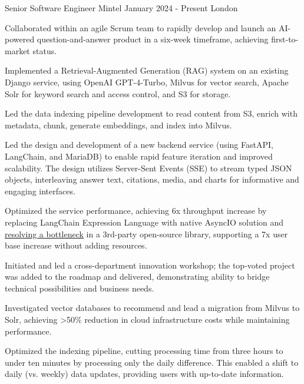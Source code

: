 \documentclass[11pt, a4paper]{awesome-cv}
\begin{document}


\begin{cventries}

  \cventry
    {Senior Software Engineer}
    {Mintel}
    {January 2024 - Present}
    {London}
    {
      \begin{cvitems}
        \item {Collaborated within an agile Scrum team to rapidly develop and launch an AI-powered question-and-answer product in a six-week timeframe, achieving first-to-market status.}
        \item {Implemented a Retrieval-Augmented Generation (RAG) system on an existing Django service, using OpenAI GPT-4-Turbo, Milvus for vector search, Apache Solr for keyword search and access control, and S3 for storage.}
        \item {Led the data indexing pipeline development to read content from S3, enrich with metadata, chunk, generate embeddings, and index into Milvus.}
        \item {Led the design and development of a new backend service (using FastAPI, LangChain, and MariaDB) to enable rapid feature iteration and improved scalability. The design utilizes Server-Sent Events (SSE) to stream typed JSON objects, interleaving answer text, citations, media, and charts for informative and engaging interfaces.}
        \item {Optimized the service performance, achieving 6x throughput increase by replacing LangChain Expression Language with native AsyncIO solution and \href{https://leverstone.me/blog/performance-profiling-in-python-tools-techniques-and-an-unexpected-culprit}{resolving a bottleneck}
         in a 3rd-party open-source library, supporting a 7x user base increase without adding resources.}
        \item {Initiated and led a cross-department innovation workshop; the top-voted project was added to the roadmap and delivered, demonstrating ability to bridge technical possibilities and business needs.}
        \item {Investigated vector databases to recommend and lead a migration from Milvus to Solr, achieving >50\% reduction in cloud infrastructure costs while maintaining performance.}
        \item {Optimized the indexing pipeline, cutting processing time from three hours to under ten minutes by processing only the daily difference. This enabled a shift to daily (vs. weekly) data updates, providing users with up-to-date information.}

\end{cvitems}}
\end{cventries}
\end{document}
